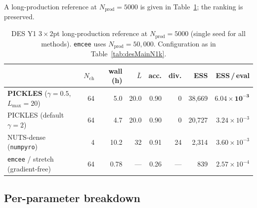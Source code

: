 \documentclass{article}
\begin{document}
A long-production reference at $N_{\text{prod}}=5000$ is given in
Table~\ref{tab:desMainN5k}; the ranking is preserved.

\begin{table}[t]
\centering
\caption{DES Y1 $3\times 2$pt long-production reference at
$N_{\text{prod}}=5000$ (single seed for all methods).
\texttt{emcee} uses $N_{\text{prod}}=50{,}000$.
Configuration as in Table~\ref{tab:desMainN1k}.}
\label{tab:desMainN5k}
\small
\begin{tabular}{l rrrrr rr}
\toprule
& $N_{\text{ch}}$ & wall (h) & $\bar L$ & acc. & div.
& ESS & ESS\,/\,eval \\
\midrule
\textbf{PICKLES} ($\gamma=0.5$, $L_{\max}=20$) & 64 & 5.0 & 20.0 & 0.90 & 0
   & 38{,}669 & $\mathbf{6.04\!\times\!10^{-3}}$ \\
PICKLES (default $\gamma=2$) & 64 & 4.7 & 20.0 & 0.90 & 0
   & 20{,}727 & $3.24\!\times\!10^{-3}$ \\
NUTS-dense (\texttt{numpyro}) & 4 & 10.2 & 32 & 0.91 & 24
   & 2{,}314 & $3.60\!\times\!10^{-3}$ \\
\texttt{emcee} / stretch (gradient-free)
   & 64 & 0.78 & --- & 0.26 & --- & 839 & $2.57\!\times\!10^{-4}$ \\
\bottomrule
\end{tabular}
\end{table}

\subsection{Per-parameter breakdown}\label{ssec:desPerDim}
\end{document}
